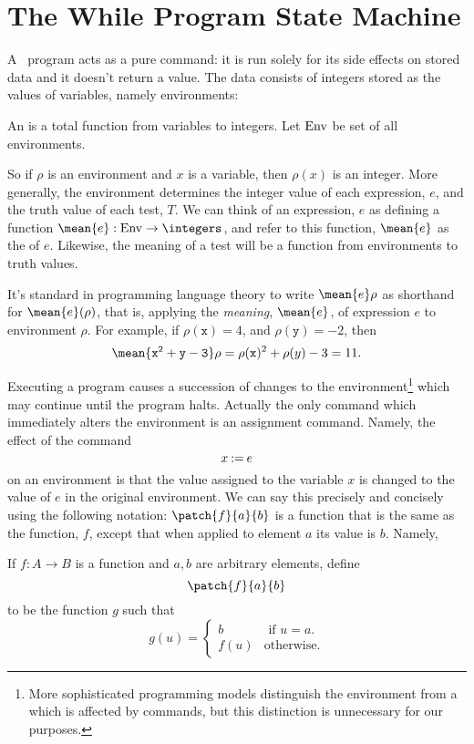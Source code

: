 \section{The \textbf{While} Program State Machine}

A \while\ program acts as a pure command: it is run solely for its
side effects on stored data and it doesn't return a value.  The data
consists of integers stored as the values of variables, namely
environments:
\begin{definition}
An  is a total function from variables to integers.
Let $\text{Env}$ be set of all environments.
\end{definition}
So if $\rho$ is an environment and $x$ is a variable, then $\rho(x)$ is an
integer.  More generally, the environment determines the integer value of
each expression, $e$, and the truth value of each test, $T$.  We can think
of an expression, $e$ as defining a function $\mean{e}:\Env \to
\integers$, and refer to this function, $\mean{e}$ as the 
of $e$.  Likewise, the meaning of a test will be a function from
environments to truth values.

It's standard in programming language theory to write $\mean{e}\rho$
as shorthand for $\mean{e}(\rho)$, that is, applying
the \emph{meaning}, $\mean{e}$, of expression $e$ to environment
$\rho$.  For example, if $\rho(\mathtt{x}) =4$, and $\rho(\mathtt{y})
=-2$, then
\begin{equation}\label{x2y311}
\mean{\mathtt{x^2+y -3}}\rho = \rho(\mathtt{x})^2 + \rho(y) -3 = 11.
\end{equation}

\iffalse
(A variable is a special case of an expression, so $\mean{x}\rho \eqdef \rho(x)$.)
\fi

Executing a program causes a succession of changes to the
environment\footnote{More sophisticated programming models distinguish
the environment from a  which is affected by commands, but
this distinction is unnecessary for our purposes.}  which may continue
until the program halts.  Actually the only command which immediately
alters the environment is an assignment command.  Namely, the effect
of the command
\[
x \mathbin{\mathtt{:=}} e
\]
on an environment is that the value assigned to the variable $x$ is
changed to the value of $e$ in the original environment.  We can say
this precisely and concisely using the following notation:
$\patch{f}{a}{b}$ is a function that is the same as the function, $f$,
except that when applied to element $a$ its value is $b$.  Namely,
\begin{definition}
If $f:A \to B$ is a function and $a,b$ are arbitrary elements, define
  \[
\patch{f}{a}{b}
\]
to be the function $g$ such that
\begin{equation*}
g(u) = \begin{cases}
         b & \text{ if } u = a.\\
         f(u) & \text{otherwise.}
       \end{cases}
\end{equation*}
\end{definition}

